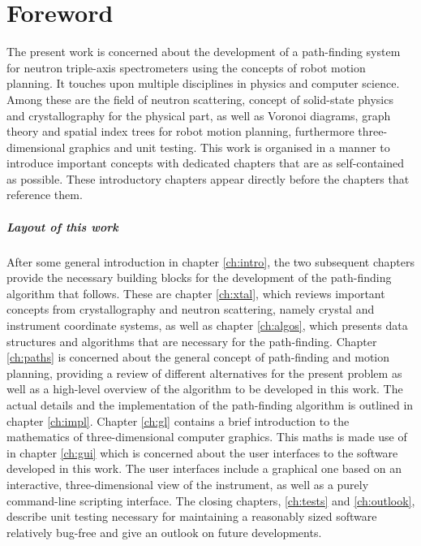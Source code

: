 %
%

\chapter*{Foreword}
The present work is concerned about the development of a path-finding system for neutron triple-axis
spectrometers using the concepts of robot motion planning.
It touches upon multiple disciplines in physics and computer science. Among these are the field
of neutron scattering, concept of solid-state physics and crystallography for the physical part,
as well as Voronoi diagrams, graph theory and spatial index trees for robot motion 
planning, furthermore three-dimensional graphics and unit testing.
This work is organised in a manner to introduce important concepts with dedicated chapters that are
as self-contained as possible. These introductory chapters appear directly before the chapters that reference
them.

\paragraph{Layout of this work}
After some general introduction in chapter \ref{ch:intro}, the two subsequent chapters 
provide the necessary building blocks for the development of the path-finding algorithm that follows.
These are chapter \ref{ch:xtal}, which reviews important concepts from crystallography and
neutron scattering, namely crystal and instrument coordinate systems,
as well as chapter \ref{ch:algos}, which presents data structures and algorithms 
that are necessary for the path-finding.
Chapter \ref{ch:paths} is concerned about the general concept of path-finding and motion planning, providing
a review of different alternatives for the present problem as well as a high-level overview of the algorithm
to be developed in this work. The actual details and the implementation of the path-finding algorithm
is outlined in chapter \ref{ch:impl}.
Chapter \ref{ch:gl} contains a brief introduction to the mathematics of three-dimensional computer graphics.
This maths is made use of in chapter \ref{ch:gui} which is concerned about the user interfaces to the software
developed in this work. The user interfaces include a graphical one based on an interactive, three-dimensional
view of the instrument, as well as a purely command-line scripting interface.
The closing chapters, \ref{ch:tests} and \ref{ch:outlook}, describe unit testing necessary for maintaining
a reasonably sized software relatively bug-free and give an outlook on future developments.

